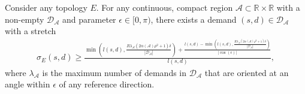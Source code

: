 \documentclass[10pt,a4paper]{amsart}
\begin{document}
\begin{theorem}
Consider any topology $E$. 
For any continuous, compact region $\mathcal{A} \subset \mathbb{R} \times \mathbb{R}$ with a non-empty $\mathcal{D}_\mathcal{A}$ and parameter $\epsilon \in [0, \pi)$, there exists a demand $(s,d) \in \mathcal{D}_\mathcal{A}$ with a stretch 
\begin{align}
\sigma_E(s,d) \geq \frac{ \min \left(l(s,d), \frac{R \lambda_\mathcal{A} (2\alpha(\mathcal{A}) \rho^2 + 1) \delta}{ |\mathcal{D}_\mathcal{A}|} \right)  + \frac{l(s,d) -   \min \left(l(s,d), \frac{R \lambda_\mathcal{A} (2\alpha(\mathcal{A}) \rho^2 + 1) \delta}{ |\mathcal{D}_\mathcal{A}|} \right)}{| \cos(\epsilon) |} }{ l(s,d) },
\end{align} 
where $\lambda_\mathcal{A}$ is the maximum number of demands in $\mathcal{D}_\mathcal{A}$ that are oriented at an angle within $\epsilon$ of any reference direction.   
\end{theorem}
\end{document}

